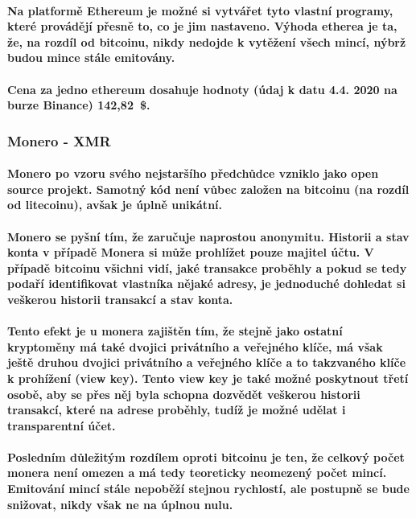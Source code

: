 \documentclass[thesis=B,czech]{FITthesis}[2019/03/21]
\begin{document}
\paragraph{
Na platformě Ethereum je možné si vytvářet tyto vlastní programy, které provádějí přesně to, co je jim nastaveno. \cite{ethereum} Výhoda etherea je ta, že, na rozdíl od bitcoinu, nikdy nedojde k vytěžení všech mincí, nýbrž budou mince stále emitovány. \cite{alza_monero}
}
\paragraph{
Cena za jedno ethereum dosahuje hodnoty (údaj k datu 4.4. 2020 na burze Binance) 142,82~\$. \cite{binance_markets}
}
\subsubsection{Monero - XMR}
\paragraph{
Monero po vzoru svého nejstaršího předchůdce vzniklo jako open source projekt. Samotný kód není vůbec založen na bitcoinu (na rozdíl od litecoinu), avšak je úplně unikátní. 
}
\paragraph{
Monero se pyšní tím, že zaručuje naprostou anonymitu. Historii a stav konta v případě Monera si může prohlížet pouze majitel účtu. V případě bitcoinu všichni vidí, jaké transakce proběhly a pokud se tedy podaří identifikovat vlastníka nějaké adresy, je jednoduché dohledat si veškerou historii transakcí a stav konta.
}
\paragraph{
Tento efekt je u monera zajištěn tím, že stejně jako ostatní kryptoměny má také dvojici privátního a veřejného klíče, má však ještě druhou dvojici privátního a veřejného klíče a to takzvaného klíče k prohížení (view key). Tento view key je také možné poskytnout třetí osobě, aby se přes něj byla schopna dozvědět veškerou historii transakcí, které na adrese proběhly, tudíž je možné udělat i transparentní účet.
}
\paragraph{
Posledním důležitým rozdílem oproti bitcoinu je ten, že celkový počet monera není omezen a má tedy teoreticky neomezený počet mincí. Emitování mincí stále nepoběží stejnou rychlostí, ale postupně se bude snižovat, nikdy však ne na úplnou nulu. \cite{alza_monero}
}
\end{document}
